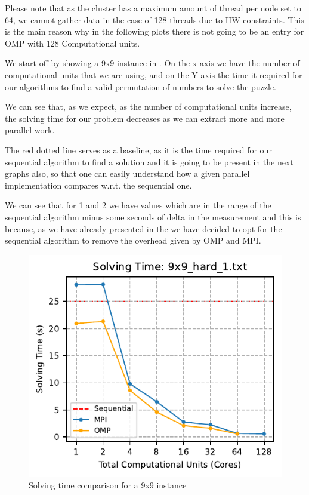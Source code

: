 Please note that as the cluster has a maximum amount of thread per node set to 64, we cannot gather data in the case of 128 threads due to HW constraints. This is the main reason why in the following plots there is not going to be an entry for OMP with 128 Computational units.


We start off by showing a 9x9 instance in . On the x axis we have the number of computational units that we are using, and on the Y axis the time it required for our algorithms to find a valid permutation of numbers to solve the puzzle.

We can see that, as we expect, as the number of computational units increase, the solving time for our problem decreases as we can extract more and more parallel work.

The red dotted line serves as a baseline, as it is the time required for our sequential algorithm to find a solution and it is going to be present in the next graphs also, so that one can easily understand how a given parallel implementation compares w.r.t. the sequential one.

We can see that for 1 and 2 we have values which are in the range of the sequential algorithm minus some seconds of delta in the measurement and this is because, as we have already presented in the  we have decided to opt for the sequential algorithm to remove the overhead given by OMP and MPI.

\begin{figure}[htbp]
\centering
\includegraphics[width=0.9\linewidth]{imgs/comparison_solving_time_9x9_hard_1.pdf}
\caption{Solving time comparison for a 9x9 instance}
\label{fig:comparison_solving_time_9x9}
\end{figure}

